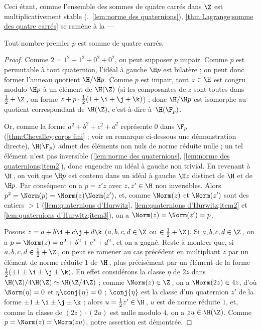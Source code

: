 \documentclass[11pt, useosf,
  title in boldface,
  theorem in new line,
  theorem numbering = section,
  number theorems separately,
]{simplivre}
\begin{document}
    Ceci étant, comme l'ensemble des sommes de quatre carrés dans \( \Z \) est multiplicativement stable (\cf.~\cref{lem:norme des quaternions}), \cref{thm:Lagrange;somme des quatre carrés} se ramène à la ---
    \begin{proposition}
        Tout nombre premier \( p \) est somme de quatre carrés.
    \end{proposition}
    \begin{proof}
        Comme \( 2 = 1^2+1^2+0^2+0^2 \), on peut supposer \( p \) impair. Comme \( p \) est permutable à tout quaternion, l'idéal à gauche \( \H p \) est bilatère ; on peut donc former l'anneau quotient \( \H / \H p \). Comme \( p \) est impair, tout \( z \in \H \) est congru modulo \( \H p \) à un élément de \( \H(\Z) \) (si les composantes de \( z \) sont toutes dans \( \frac{1}{2}+\Z \)\,, on forme \( z + p \cdot \frac{1}{2}(1+\i+\j+\k) \)) ; donc \( \H / \H p \) est isomorphe au quotient correspondant de \( \H(\Z) \), c'est-à-dire à~\( \H(\F_p) \).

\enlargethispage*{\baselineskip}
        Or, comme la forme \( a^2+b^2+c^2+d^2 \) représente \( 0 \) dans \( \F_p \) (\cref{thm:Chevalley;corps fini} ; voir en remarque ci-dessous une démonstration directe), \( \H(\F_p) \) admet des éléments non nuls de norme réduite nulle ; un tel élément n'est pas inversible (\cref{lem:norme des quaternions}, \ref{lem:norme des quaternions;item2}), donc engendre un idéal à gauche non trivial. En revenant à \( \H \)\,, on voit que \( \H p \) est contenu dans un idéal à gauche \( \H z \) distinct de \( \H \) et de \( \H p \). Par conséquent on a \( p = z' z \) avec \( z,z' \in \H \) non inversibles. Alors \( p^2 = \Norm(p) = \Norm(z)\Norm(z') \), et, comme \( \Norm(z) \) et \( \Norm(z') \) sont des entiers \( > 1 \) (\cref{lem:quaternions d'Hurwitz}, \ref{lem:quaternions d'Hurwitz;item2} et \ref{lem:quaternions d'Hurwitz;item3}), on a \( \Norm(z) = \Norm(z') = p \).

        Posons \( z = a+b\i+c\j+d\k \) (\( a,b,c,d \in \Z \) ou \( \in \frac{1}{2}+\Z \)). Si \( a,b,c,d \in \Z \)\,, on a \( p = \Norm(z) = a^2+b^2+c^2+d^2 \), et on a gagné. Reste à montrer que, si \( a,b,c,d \in \frac{1}{2}+\Z \)\,, on peut se ramener au cas précédent en multipliant \( z \) par un élément de norme réduite \( 1 \) de \( \H \)\,, plus précisément par un élément de la forme \( \frac{1}{2}(\pm 1 \pm \i \pm \j \pm \k) \). En effet considérons la classe \( \eta \) de \( 2z \) dans \( \H(\Z)/4\H(\Z) \simeq \H(\Z/4\Z) \) ; comme \( \Norm(z) \in \Z \)\,, on a \( \Norm(2z) \in 4z \), d'où \( \Norm(\eta) = 0 \) et \( \eta \conj{\eta} = 0 \) ; \( \conj{\eta} \) est la classe d'un quaternion \( z' \) de la forme \( \pm 1 \pm \i \pm \j \pm \k \) ; alors \( u = \frac{1}{2}z' \in \H \)\,, \( u \) est de norme réduite \( 1 \), et, comme la classe de \( (2z)\cdot(2u) \) est nulle modulo \( 4 \), on a \( zu \in \H(\Z) \). Comme \( p = \Norm(z) = \Norm(zu) \), notre assertion est démontrée.
    \end{proof}
\end{document}
